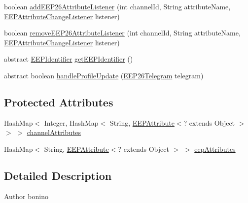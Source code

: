 \begin{DoxyCompactItemize}
boolean \hyperlink{classit_1_1polito_1_1elite_1_1enocean_1_1enj_1_1eep_1_1_e_e_p_a85a1b0ed3a14e033414942ce9c05e268}{add\+E\+E\+P26\+Attribute\+Listener} (int channel\+Id, String attribute\+Name, \hyperlink{interfaceit_1_1polito_1_1elite_1_1enocean_1_1enj_1_1eep_1_1_e_e_p_attribute_change_listener}{E\+E\+P\+Attribute\+Change\+Listener} listener)
\item 
boolean \hyperlink{classit_1_1polito_1_1elite_1_1enocean_1_1enj_1_1eep_1_1_e_e_p_a98771859eb0e1be096889989af319f85}{remove\+E\+E\+P26\+Attribute\+Listener} (int channel\+Id, String attribute\+Name, \hyperlink{interfaceit_1_1polito_1_1elite_1_1enocean_1_1enj_1_1eep_1_1_e_e_p_attribute_change_listener}{E\+E\+P\+Attribute\+Change\+Listener} listener)
\item 
abstract \hyperlink{classit_1_1polito_1_1elite_1_1enocean_1_1enj_1_1eep_1_1_e_e_p_identifier}{E\+E\+P\+Identifier} \hyperlink{classit_1_1polito_1_1elite_1_1enocean_1_1enj_1_1eep_1_1_e_e_p_a4070449b64e3a9d3882b784b80dc07b0}{get\+E\+E\+P\+Identifier} ()
\item 
abstract boolean \hyperlink{classit_1_1polito_1_1elite_1_1enocean_1_1enj_1_1eep_1_1_e_e_p_ac9e679e1f3266f640b7373a394bc0a19}{handle\+Profile\+Update} (\hyperlink{classit_1_1polito_1_1elite_1_1enocean_1_1enj_1_1eep_1_1eep26_1_1telegram_1_1_e_e_p26_telegram}{E\+E\+P26\+Telegram} telegram)
\end{DoxyCompactItemize}
\subsection*{Protected Attributes}
\begin{DoxyCompactItemize}
\item 
Hash\+Map$<$ Integer, Hash\+Map$<$ String, \hyperlink{classit_1_1polito_1_1elite_1_1enocean_1_1enj_1_1eep_1_1_e_e_p_attribute}{E\+E\+P\+Attribute}$<$? extends Object $>$ $>$ $>$ \hyperlink{classit_1_1polito_1_1elite_1_1enocean_1_1enj_1_1eep_1_1_e_e_p_af617ce25c766ff9906369ece400e8377}{channel\+Attributes}
\item 
Hash\+Map$<$ String, \hyperlink{classit_1_1polito_1_1elite_1_1enocean_1_1enj_1_1eep_1_1_e_e_p_attribute}{E\+E\+P\+Attribute}$<$? extends Object $>$ $>$ \hyperlink{classit_1_1polito_1_1elite_1_1enocean_1_1enj_1_1eep_1_1_e_e_p_af51f35cb6325e71d645bddaf87f059bf}{eep\+Attributes}
\end{DoxyCompactItemize}


\subsection{Detailed Description}
\begin{DoxyAuthor}{Author}
bonino 
\end{DoxyAuthor}

